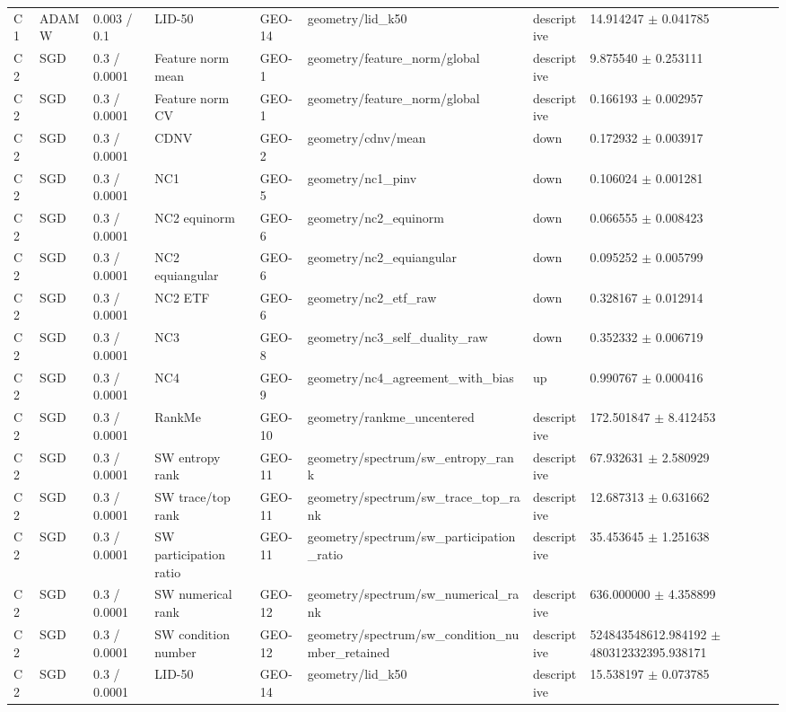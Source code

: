 \begin{longtable}{llllllll}
C1 & ADAMW & 0.003 / 0.1 & LID-50 & GEO-14 & geometry/lid\_k50 & descriptive & 14.914247 $\pm$ 0.041785 \\
C2 & SGD & 0.3 / 0.0001 & Feature norm mean & GEO-1 & geometry/feature\_norm/global & descriptive & 9.875540 $\pm$ 0.253111 \\
C2 & SGD & 0.3 / 0.0001 & Feature norm CV & GEO-1 & geometry/feature\_norm/global & descriptive & 0.166193 $\pm$ 0.002957 \\
C2 & SGD & 0.3 / 0.0001 & CDNV & GEO-2 & geometry/cdnv/mean & down & 0.172932 $\pm$ 0.003917 \\
C2 & SGD & 0.3 / 0.0001 & NC1 & GEO-5 & geometry/nc1\_pinv & down & 0.106024 $\pm$ 0.001281 \\
C2 & SGD & 0.3 / 0.0001 & NC2 equinorm & GEO-6 & geometry/nc2\_equinorm & down & 0.066555 $\pm$ 0.008423 \\
C2 & SGD & 0.3 / 0.0001 & NC2 equiangular & GEO-6 & geometry/nc2\_equiangular & down & 0.095252 $\pm$ 0.005799 \\
C2 & SGD & 0.3 / 0.0001 & NC2 ETF & GEO-6 & geometry/nc2\_etf\_raw & down & 0.328167 $\pm$ 0.012914 \\
C2 & SGD & 0.3 / 0.0001 & NC3 & GEO-8 & geometry/nc3\_self\_duality\_raw & down & 0.352332 $\pm$ 0.006719 \\
C2 & SGD & 0.3 / 0.0001 & NC4 & GEO-9 & geometry/nc4\_agreement\_with\_bias & up & 0.990767 $\pm$ 0.000416 \\
C2 & SGD & 0.3 / 0.0001 & RankMe & GEO-10 & geometry/rankme\_uncentered & descriptive & 172.501847 $\pm$ 8.412453 \\
C2 & SGD & 0.3 / 0.0001 & SW entropy rank & GEO-11 & geometry/spectrum/sw\_entropy\_rank & descriptive & 67.932631 $\pm$ 2.580929 \\
C2 & SGD & 0.3 / 0.0001 & SW trace/top rank & GEO-11 & geometry/spectrum/sw\_trace\_top\_rank & descriptive & 12.687313 $\pm$ 0.631662 \\
C2 & SGD & 0.3 / 0.0001 & SW participation ratio & GEO-11 & geometry/spectrum/sw\_participation\_ratio & descriptive & 35.453645 $\pm$ 1.251638 \\
C2 & SGD & 0.3 / 0.0001 & SW numerical rank & GEO-12 & geometry/spectrum/sw\_numerical\_rank & descriptive & 636.000000 $\pm$ 4.358899 \\
C2 & SGD & 0.3 / 0.0001 & SW condition number & GEO-12 & geometry/spectrum/sw\_condition\_number\_retained & descriptive & 524843548612.984192 $\pm$ 480312332395.938171 \\
C2 & SGD & 0.3 / 0.0001 & LID-50 & GEO-14 & geometry/lid\_k50 & descriptive & 15.538197 $\pm$ 0.073785 \\

\end{longtable}
